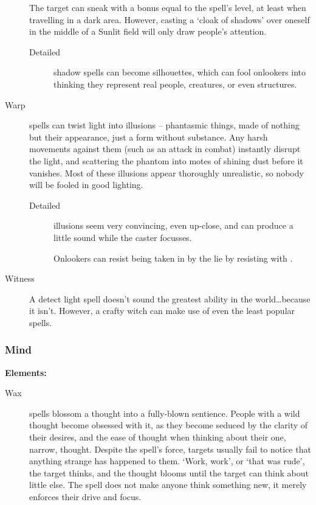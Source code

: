 \begin{multicols}{2}
\begin{description}
    The target can sneak with a bonus equal to the spell's level, at least when travelling in a dark area.
    However, casting a `cloak of shadows' over oneself in the middle of a Sunlit field will only draw people's attention.
    \begin{description}
      \item[Detailed]
        shadow spells can become silhouettes, which can fool onlookers into thinking they represent real people, creatures, or even structures.
    \end{description}
  \item[Warp]
    spells can twist light into illusions -- phantasmic things, made of nothing but their appearance, just a form without substance.
    Any harsh movements against them (such as an attack in combat) instantly disrupt the light, and scattering the phantom into motes of shining dust before it vanishes.
    Most of these illusions appear thoroughly unrealistic, so nobody will be fooled in good lighting.
    \begin{description}
      \item[Detailed]
        illusions seem very convincing, even up-close, and can produce a little sound while the caster focusses.

        Onlookers can resist being taken in by the lie by resisting with .
    \end{description}
  \item[Witness]
    A detect light spell doesn't sound the greatest ability in the world\ldots because it isn't.
    However, a crafty witch can make use of even the least popular spells.
\end{description}

\subsubsection{Mind}

\textbf{Elements:}

\begin{description}
  \item[Wax]
    spells blossom a thought into a fully-blown sentience.
    People with a wild thought become obsessed with it, as they become seduced by the clarity of their desires, and the ease of thought when thinking about their one, narrow, thought.
    Despite the spell's force, targets usually fail to notice that anything strange has happened to them.
    `Work, work', or `that was rude', the target thinks, and the thought blooms until the target can think about little else.
    The spell does not make anyone think something new, it merely enforces their drive and focus.


\end{description}
\end{multicols}
